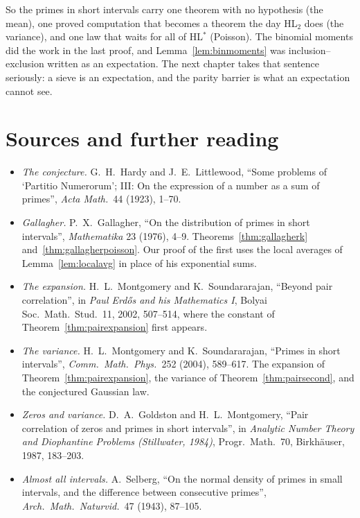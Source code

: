 So the primes in short intervals carry one theorem with no hypothesis (the mean), one proved computation that becomes a theorem the day HL$_2$ does (the variance), and one law that waits for all of HL$^*$ (Poisson). The binomial moments did the work in the last proof, and Lemma~\ref{lem:binmoments} was inclusion--exclusion written as an expectation. The next chapter takes that sentence seriously: a sieve is an expectation, and the parity barrier is what an expectation cannot see.


\section*{Sources and further reading}

\begin{itemize}
\item \emph{The conjecture.} G.~H.~Hardy and J.~E.~Littlewood, ``Some problems of `Partitio Numerorum'; III: On the expression of a number as a sum of primes'', \emph{Acta Math.}\ 44 (1923), 1--70.
\item \emph{Gallagher.} P.~X.~Gallagher, ``On the distribution of primes in short intervals'', \emph{Mathematika} 23 (1976), 4--9. Theorems~\ref{thm:gallagherk} and~\ref{thm:gallagherpoisson}. Our proof of the first uses the local averages of Lemma~\ref{lem:localavg} in place of his exponential sums.
\item \emph{The expansion.} H.~L.~Montgomery and K.~Soundararajan, ``Beyond pair correlation'', in \emph{Paul Erd\H os and his Mathematics I}, Bolyai Soc.\ Math.\ Stud.\ 11, 2002, 507--514, where the constant of Theorem~\ref{thm:pairexpansion} first appears.
\item \emph{The variance.} H.~L.~Montgomery and K.~Soundararajan, ``Primes in short intervals'', \emph{Comm.\ Math.\ Phys.}\ 252 (2004), 589--617. The expansion of Theorem~\ref{thm:pairexpansion}, the variance of Theorem~\ref{thm:pairsecond}, and the conjectured Gaussian law.
\item \emph{Zeros and variance.} D.~A.~Goldston and H.~L.~Montgomery, ``Pair correlation of zeros and primes in short intervals'', in \emph{Analytic Number Theory and Diophantine Problems (Stillwater, 1984)}, Progr.\ Math.\ 70, Birkhäuser, 1987, 183--203.
\item \emph{Almost all intervals.} A.~Selberg, ``On the normal density of primes in small intervals, and the difference between consecutive primes'', \emph{Arch.\ Math.\ Naturvid.}\ 47 (1943), 87--105.
\end{itemize}
